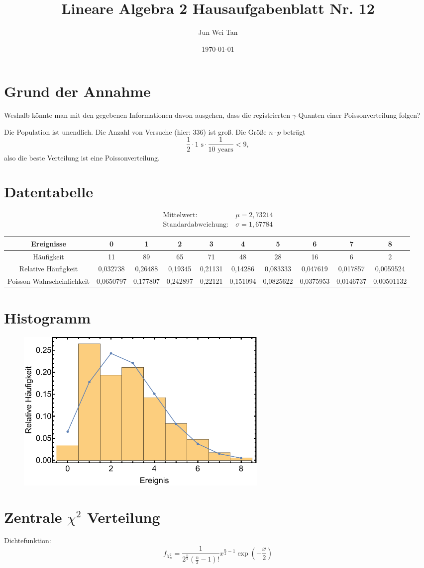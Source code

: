 \documentclass[prb,12pt]{revtex4-2}
\theoremstyle{definition}
\theoremstyle{definition}
\begin{document}
	\title{Lineare Algebra 2 Hausaufgabenblatt Nr. 12}
	\author{Jun Wei Tan}
	\date{\today}
	\maketitle

\section{Grund der Annahme}
\begin{tcolorbox}
	Weshalb könnte man mit den gegebenen Informationen davon ausgehen, dass die registrierten $\gamma$-Quanten einer Poissonverteilung folgen?
\end{tcolorbox}
Die Population ist unendlich. Die Anzahl von Versuche (hier: 336) ist groß. Die Größe $n\cdot p$ beträgt
\[\frac 12 \cdot 1\text{ s}\cdot \frac{1}{10\text{ years}}<9,\]
also die beste Verteilung ist eine Poissonverteilung.
\section{Datentabelle}
\begin{align*}
	\text{Mittelwert}:&~\mu=2,73214\\
	\text{Standardabweichung}:&~\sigma=1,67784
\end{align*}
\begin{table}[h]
	{\scriptsize
\begin{tabular}{cccccccccc}
	\toprule
	\textbf{Ereignisse} & 0 & 1 & 2 & 3 & 4 & 5 & 6 & 7 & 8 \\\midrule
	H\"{a}ufigkeit & 11 & 89 & 65 & 71 & 48 & 28 & 16 & 6 & 2 \\\midrule
	Relative H\"{a}ufigkeit & 0,032738 & 0,26488 & 0,19345 & 0,21131 & 0,14286 & 0,083333 & 0,047619 & 0,017857 & 0,0059524 \\\midrule
	Poisson-Wahrscheinlichkeit & 0,0650797 & 0,177807 & 0,242897 & 0,22121 & 0,151094 & 0,0825622 & 0,0375953 & 0,0146737 & 0,00501132 \\\bottomrule
\end{tabular}
}
\end{table}

\section{Histogramm}
\begin{figure}[h]
	\includegraphics[width=0.6\textwidth]{fig1.pdf}
	\caption{}
\end{figure}

\section{Zentrale $\chi^2$ Verteilung}
Dichtefunktion:
\[f_{\chi^2_n}=\frac{1}{2^{\frac n2}\left(\frac n2-1\right)!}x^{\frac n2 - 1}\exp\left(-\frac x2\right)\]
\end{document}
